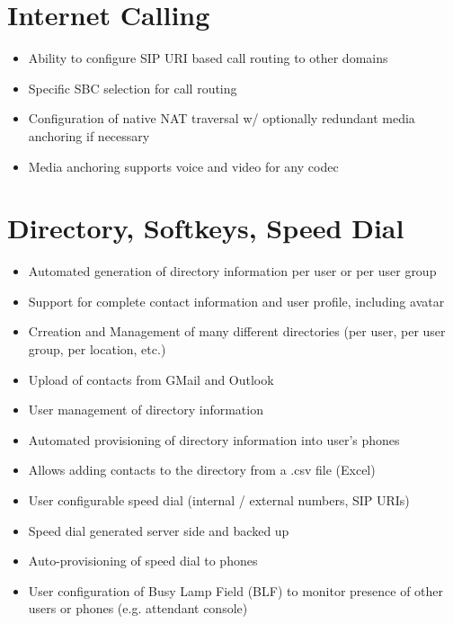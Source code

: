 \documentclass[letterpaper,10pt,english]{sphinxmanual}
\begin{document}
\section{Internet Calling}
\label{\detokenize{features:internet-calling}}\begin{itemize}
\item {} 
Ability to configure SIP URI based call routing to other domains

\item {} 
Specific SBC selection for call routing

\item {} 
Configuration of native NAT traversal w/ optionally redundant media anchoring if necessary

\item {} 
Media anchoring supports voice and video for any codec

\end{itemize}


\section{Directory, Softkeys, Speed Dial}
\label{\detokenize{features:directory-softkeys-speed-dial}}\begin{itemize}
\item {} 
Automated generation of directory information per user or per user group

\item {} 
Support for complete contact information and user profile, including avatar

\item {} 
Crreation and Management of many different directories (per user, per user group, per location, etc.)

\item {} 
Upload of contacts from GMail and Outlook

\item {} 
User management of directory information

\item {} 
Automated provisioning of directory information into user’s phones

\item {} 
Allows adding contacts to the directory from a .csv file (Excel)

\item {} 
User configurable speed dial (internal / external numbers, SIP URIs)

\item {} 
Speed dial generated server side and backed up

\item {} 
Auto-provisioning of speed dial to phones

\item {} 
User configuration of Busy Lamp Field (BLF) to monitor presence of other users or phones (e.g. attendant console)

\end{itemize}
\end{document}

